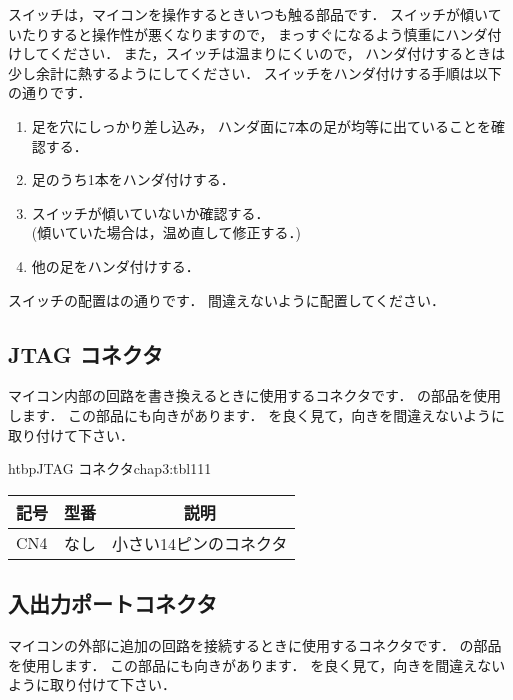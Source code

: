 

スイッチは，マイコンを操作するときいつも触る部品です．
スイッチが傾いていたりすると操作性が悪くなりますので，
まっすぐになるよう慎重にハンダ付けしてください．
また，スイッチは温まりにくいので，
ハンダ付けするときは少し余計に熱するようにしてください．
スイッチをハンダ付けする手順は以下の通りです．
\begin{enumerate}
\item 足を穴にしっかり差し込み，
ハンダ面に7本の足が均等に出ていることを確認する．
\item 足のうち1本をハンダ付けする．
\item スイッチが傾いていないか確認する．\\
(傾いていた場合は，温め直して修正する．)
\item 他の足をハンダ付けする．
\end{enumerate}
スイッチの配置はの通りです．
間違えないように配置してください．

\subsection{JTAG コネクタ}
マイコン内部の回路を書き換えるときに使用するコネクタです．
の部品を使用します．
この部品にも向きがあります．
を良く見て，向きを間違えないように取り付けて下さい．

\begin{mytable}{htbp}{JTAG コネクタ}{chap3:tbl111}
\begin{tabular}{|l|l|l|}
\hline
\multicolumn{1}{|c|}{記号} &
\multicolumn{1}{c|}{型番} &
\multicolumn{1}{c|}{説明} \\
\hline
CN4 & なし & 小さい14ピンのコネクタ \\
\hline
\end{tabular}
\end{mytable}


\subsection{入出力ポートコネクタ}
マイコンの外部に追加の回路を接続するときに使用するコネクタです．
の部品を使用します．
この部品にも向きがあります．
を良く見て，向きを間違えないように取り付けて下さい．

